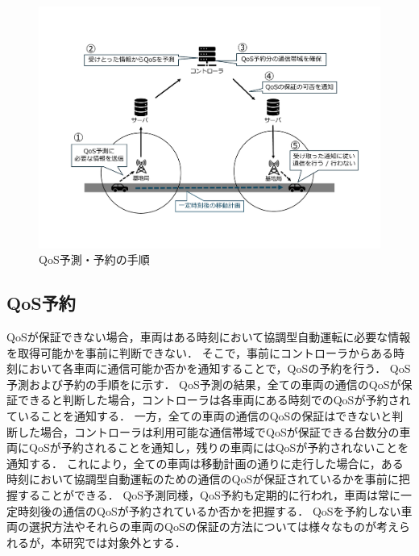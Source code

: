 \documentclass[a4paper,10pt,twocolumn,uplatex]{jsarticle}
\begin{document}
\begin{figure}[t]
	\begin{centering}
    \includegraphics[width=0.88\linewidth]{img/QoS予測・予約の手順.pdf}
    \caption{QoS予測・予約の手順}
    \label{fig:QoSP&R}
    \end{centering}
\end{figure}

\subsection{QoS予約}
QoSが保証できない場合，車両はある時刻において協調型自動運転に必要な情報を取得可能かを事前に判断できない．
そこで，事前にコントローラからある時刻において各車両に通信可能か否かを通知することで，QoSの予約を行う．
QoS予測および予約の手順をに示す．
QoS予測の結果，全ての車両の通信のQoSが保証できると判断した場合，コントローラは各車両にある時刻でのQoSが予約されていることを通知する．
一方，全ての車両の通信のQoSの保証はできないと判断した場合，コントローラは利用可能な通信帯域でQoSが保証できる台数分の車両にQoSが予約されることを通知し，残りの車両にはQoSが予約されないことを通知する．
これにより，全ての車両は移動計画の通りに走行した場合に，ある時刻において協調型自動運転のための通信のQoSが保証されているかを事前に把握することができる．
QoS予測同様，QoS予約も定期的に行われ，車両は常に一定時刻後の通信のQoSが予約されているか否かを把握する．
QoSを予約しない車両の選択方法やそれらの車両のQoSの保証の方法については様々なものが考えられるが，本研究では対象外とする．

\end{document}
